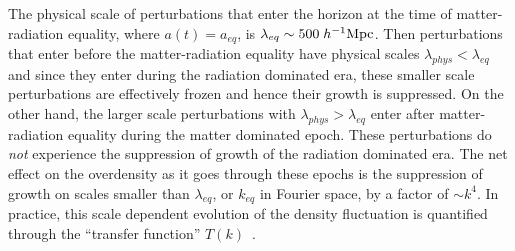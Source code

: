 The physical scale of perturbations that enter the horizon at the time of 
matter-radiation equality, where $a(t) = a_{eq}$, is $\lambda_{eq} \sim 500\;h^{-1}{\rm Mpc}$.
Then perturbations that enter before the matter-radiation equality 
have physical scales $\lambda_{phys} < \lambda_{eq}$ and since they enter
during the radiation dominated era, these smaller scale perturbations 
are effectively frozen and hence their growth is suppressed.
On the other hand, the larger scale perturbations with $\lambda_{phys} > \lambda_{eq}$
enter after matter-radiation equality during the matter dominated epoch. These 
perturbations do {\em not} experience the suppression of growth of the radiation 
dominated era. The net effect on the overdensity as it goes through these epochs 
is the suppression of growth on scales smaller than $\lambda_{eq}$, or $k_{eq}$ in 
Fourier space, by a factor of $\sim k^4$. In practice, this scale dependent 
evolution of the density fluctuation is quantified through the 
``transfer function'' $T(k)$~\citep{Eisenstein:1998aa, Eisenstein:1999aa}. 

